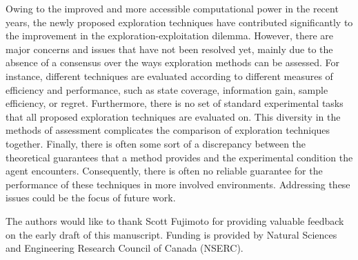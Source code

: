 Owing to the improved and more accessible computational power in the recent years, the newly proposed exploration techniques have contributed significantly to the improvement in the exploration-exploitation dilemma. However, there are major concerns and issues that have not been resolved yet, mainly due to the absence of a consensus over the ways exploration methods can be assessed. For instance, different techniques are evaluated according to different measures of efficiency and performance, such as state coverage, information gain, sample efficiency, or regret. Furthermore, there is no set of standard experimental tasks that all proposed exploration techniques are evaluated on. This diversity in the methods of assessment complicates the comparison of exploration techniques together. Finally, there is often some sort of a discrepancy between the theoretical guarantees that a method provides and the experimental condition the agent encounters.  Consequently, there is often no reliable guarantee for the performance of these techniques in more involved environments. Addressing these issues could be the focus of future work.

\label{sec:acknowledge}
The authors would like to thank Scott Fujimoto for providing valuable feedback on the early draft of this manuscript. Funding is provided by Natural Sciences and Engineering Research Council of Canada (NSERC).
\newpage
\newpage

